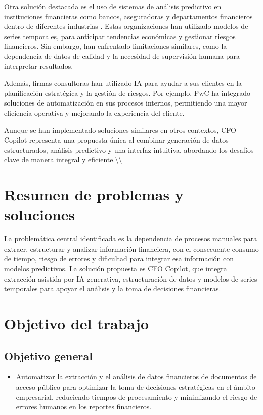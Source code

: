 \documentclass[12pt,letterpaper,oneside]{report}
\renewcommand{\_}{\UnderscoreOriginal\allowbreak}
\begin{document}
Otra solución destacada es el uso de sistemas de análisis predictivo en instituciones financieras como bancos, aseguradoras y departamentos financieros dentro de diferentes industrias \parencite{MicorsoftEaton2024}. Estas organizaciones han utilizado modelos de series temporales, para anticipar tendencias económicas y gestionar riesgos financieros. Sin embargo, han enfrentado limitaciones similares, como la dependencia de datos de calidad y la necesidad de supervisión humana para interpretar resultados.

Además, firmas consultoras han utilizado IA para ayudar a sus clientes en la planificación estratégica y la gestión de riesgos. Por ejemplo, PwC ha integrado soluciones de automatización en sus procesos internos, permitiendo una mayor eficiencia operativa y mejorando la experiencia del cliente. \parencite{PWC2024}

Aunque se han implementado soluciones similares en otros contextos, CFO Copilot representa una propuesta única al combinar generación de datos estructurados, análisis predictivo y una interfaz intuitiva, abordando los desafíos clave de manera integral y eficiente.\textbackslash{}\textbackslash{}

\section{Resumen de problemas y soluciones}
La problemática central identificada es la dependencia de procesos manuales para extraer, estructurar y analizar información financiera, con el consecuente consumo de tiempo, riesgo de errores y dificultad para integrar esa información con modelos predictivos. La solución propuesta es CFO Copilot, que integra extracción asistida por IA generativa, estructuración de datos y modelos de series temporales para apoyar el análisis y la toma de decisiones financieras.

\section{Objetivo del trabajo}
\subsection{Objetivo general}
\begin{itemize}
\item Automatizar la extracción y el análisis de datos financieros de documentos de acceso público para optimizar la toma de decisiones estratégicas en el ámbito empresarial, reduciendo tiempos de procesamiento y minimizando el riesgo de errores humanos en los reportes financieros.
\end{itemize}
\end{document}

